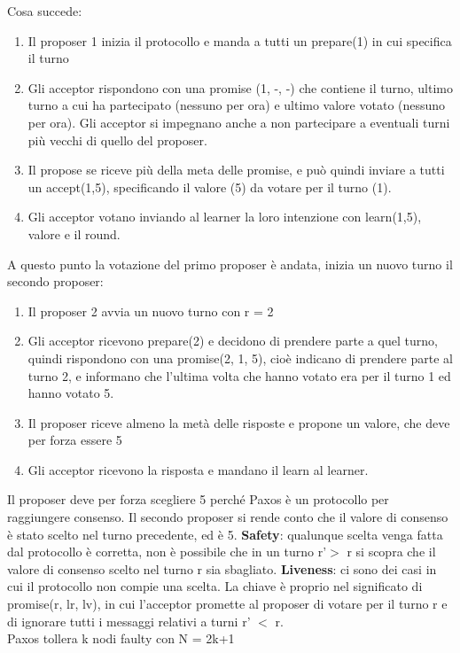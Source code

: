 \documentclass[12pt,italian]{report}
\begin{document}
\noindent Cosa succede:
\begin{enumerate}
    \item Il proposer 1 inizia il protocollo e manda a tutti un prepare(1) in cui specifica il turno
    \item Gli acceptor rispondono con una promise (1, -, -) che contiene il turno, ultimo turno a cui ha partecipato (nessuno per ora) e ultimo valore votato (nessuno per ora). Gli acceptor si impegnano anche a non partecipare a eventuali turni più vecchi di quello del proposer. 
    \item Il propose se riceve più della meta delle promise, e può quindi inviare a tutti un accept(1,5), specificando il valore (5) da votare per il turno (1). \item Gli acceptor votano inviando al learner la loro intenzione con learn(1,5), valore e il round. 
\end{enumerate}
A questo punto la votazione del primo proposer è andata, inizia un nuovo turno il secondo proposer: 
\begin{enumerate}
    \item Il proposer 2 avvia un nuovo turno con r = 2
    \item Gli acceptor ricevono prepare(2) e decidono di prendere parte a quel turno, quindi rispondono con una promise(2, 1, 5), cioè indicano di prendere parte al turno 2, e informano che l'ultima volta che hanno votato era per il turno 1 ed hanno votato 5.
    \item Il proposer riceve almeno la metà delle risposte e propone un valore, che deve per forza essere 5
    \item Gli acceptor ricevono la risposta e mandano il learn al learner. 
\end{enumerate}
Il proposer deve per forza scegliere 5 perché Paxos è un protocollo per raggiungere consenso. Il secondo proposer si rende conto che il valore di consenso è stato scelto nel turno precedente, ed è 5. 
\bigbreak
\noindent \textbf{Safety}: qualunque scelta venga fatta dal protocollo è corretta, non è possibile che in un turno r'$>$ r si scopra che il valore di consenso scelto nel turno r sia sbagliato.
\noindent \textbf{Liveness}: ci sono dei casi in cui il protocollo non compie una scelta. La chiave è proprio nel significato di promise(r, lr, lv), in cui l'acceptor promette al proposer di votare per il turno r e di ignorare tutti i messaggi relativi a turni r' $<$ r. \\ Paxos tollera k nodi faulty con N = 2k+1
\end{document}
